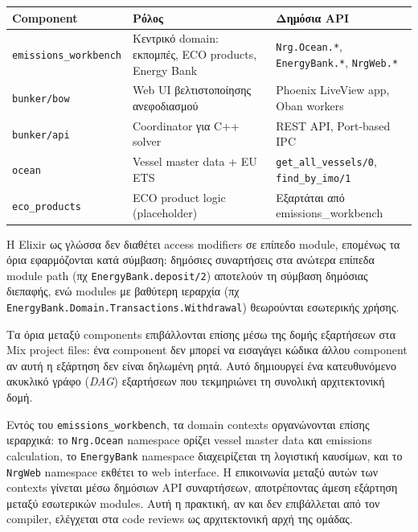{\def\LTcaptype{} %
\begin{longtable}[]{@{}
  >{\raggedright\arraybackslash}p{}
  >{\raggedright\arraybackslash}p{}
  >{\raggedright\arraybackslash}p{}@{}}
\toprule\noalign{}
\begin{minipage}[b]{\linewidth}\raggedright
Component
\end{minipage} & \begin{minipage}[b]{\linewidth}\raggedright
Ρόλος
\end{minipage} & \begin{minipage}[b]{\linewidth}\raggedright
Δημόσια API
\end{minipage} \\
\midrule\noalign{}
\endhead
\bottomrule\noalign{}
\endlastfoot
\texttt{emissions\_workbench} & Κεντρικό domain: εκπομπές, ECO products,
Energy Bank & \texttt{Nrg.Ocean.*}, \texttt{EnergyBank.*},
\texttt{NrgWeb.*} \\
\texttt{bunker/bow} & Web UI βελτιστοποίησης ανεφοδιασμού & Phoenix
LiveView app, Oban workers \\
\texttt{bunker/api} & Coordinator για C++ solver & REST API, Port-based
IPC \\
\texttt{ocean} & Vessel master data + EU ETS &
\texttt{get\_all\_vessels/0}, \texttt{find\_by\_imo/1} \\
\texttt{eco\_products} & ECO product logic (placeholder) & Εξαρτάται από
emissions\_workbench \\
\end{longtable}
}

Η Elixir ως γλώσσα δεν διαθέτει access modifiers σε επίπεδο module,
επομένως τα όρια εφαρμόζονται κατά σύμβαση: δημόσιες συναρτήσεις στα
ανώτερα επίπεδα module path (πχ \texttt{EnergyBank.deposit/2}) αποτελούν
τη σύμβαση δημόσιας διεπαφής, ενώ modules με βαθύτερη ιεραρχία (πχ
\texttt{EnergyBank.Domain.Transactions.Withdrawal}) θεωρούνται
εσωτερικής χρήσης.

Τα όρια μεταξύ components επιβάλλονται επίσης μέσω της δομής εξαρτήσεων
στα Mix project files: ένα component δεν μπορεί να εισαγάγει κώδικα
άλλου component αν αυτή η εξάρτηση δεν είναι δηλωμένη ρητά. Αυτό
δημιουργεί ένα κατευθυνόμενο ακυκλικό γράφο (\emph{DAG}) εξαρτήσεων που
τεκμηριώνει τη συνολική αρχιτεκτονική δομή.

Εντός του \texttt{emissions\_workbench}, τα domain contexts οργανώνονται
επίσης ιεραρχικά: το \texttt{Nrg.Ocean} namespace ορίζει vessel master
data και emissions calculation, το \texttt{EnergyBank} namespace
διαχειρίζεται τη λογιστική καυσίμων, και το \texttt{NrgWeb} namespace
εκθέτει το web interface. Η επικοινωνία μεταξύ αυτών των contexts
γίνεται μέσω δημόσιων API συναρτήσεων, αποτρέποντας άμεση εξάρτηση
μεταξύ εσωτερικών modules. Αυτή η πρακτική, αν και δεν επιβάλλεται από
τον compiler, ελέγχεται στα code reviews ως αρχιτεκτονική αρχή της
ομάδας.

